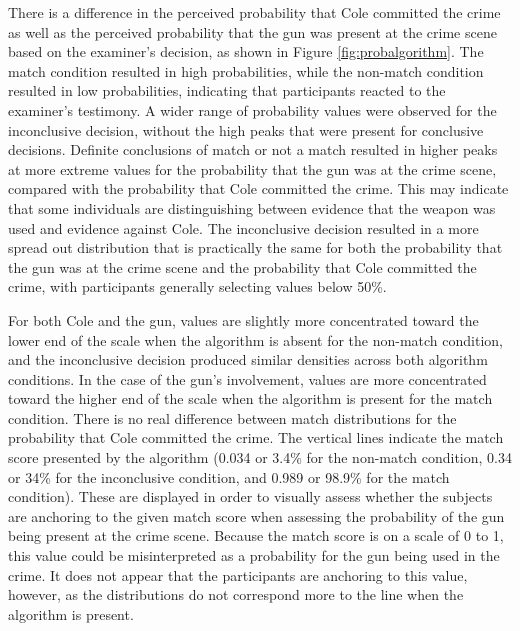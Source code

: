 \documentclass[print]{nuthesis}
\begin{document}
There is a difference in the perceived probability that Cole committed the crime as well as the perceived probability that the gun was present at the crime scene based on the examiner's decision, as shown in Figure \ref{fig:probalgorithm}.
The match condition resulted in high probabilities, while the non-match condition resulted in low probabilities, indicating that participants reacted to the examiner's testimony.
A wider range of probability values were observed for the inconclusive decision, without the high peaks that were present for conclusive decisions.
Definite conclusions of match or not a match resulted in higher peaks at more extreme values for the probability that the gun was at the crime scene, compared with the probability that Cole committed the crime.
This may indicate that some individuals are distinguishing between evidence that the weapon was used and evidence against Cole.
The inconclusive decision resulted in a more spread out distribution that is practically the same for both the probability that the gun was at the crime scene and the probability that Cole committed the crime, with participants generally selecting values below 50\%.

For both Cole and the gun, values are slightly more concentrated toward the lower end of the scale when the algorithm is absent for the non-match condition, and the inconclusive decision produced similar densities across both algorithm conditions.
In the case of the gun's involvement, values are more concentrated toward the higher end of the scale when the algorithm is present for the match condition.
There is no real difference between match distributions for the probability that Cole committed the crime.
The vertical lines indicate the match score presented by the algorithm (0.034 or 3.4\% for the non-match condition, 0.34 or 34\% for the inconclusive condition, and 0.989 or 98.9\% for the match condition).
These are displayed in order to visually assess whether the subjects are anchoring to the given match score when assessing the probability of the gun being present at the crime scene.
Because the match score is on a scale of 0 to 1, this value could be misinterpreted as a probability for the gun being used in the crime.
It does not appear that the participants are anchoring to this value, however, as the distributions do not correspond more to the line when the algorithm is present.
\end{document}
